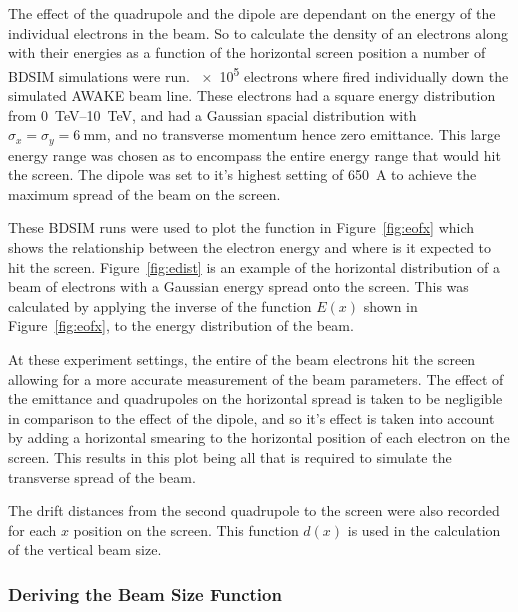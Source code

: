The effect of the quadrupole and the dipole are dependant on the energy of the
individual electrons in the beam.  So to calculate the density of an electrons
along with their energies as a function of the horizontal screen position a
number of BDSIM simulations were run. \num{e5} electrons where fired
individually down the simulated AWAKE beam line. These electrons had a square
energy distribution from \SIrange{0}{10} {\tera\electronvolt}, and had a
Gaussian spacial distribution with \(\sigma_x = \sigma_y =
\SI{6}{\milli\meter}\), and no transverse momentum hence zero emittance. This
large energy range was chosen as to encompass the entire energy range that would
hit the screen. The dipole was set to it's highest setting of \SI{650}{\ampere}
to achieve the maximum spread of the beam on the screen.

These BDSIM runs were used to plot the function in Figure~\ref{fig:eofx} which
shows the relationship between the electron energy and where is it expected to
hit the screen. Figure~\ref{fig:edist} is an example of the horizontal
distribution of a beam of electrons with a Gaussian energy spread onto the
screen. This was calculated by applying the inverse of the function \(E(x)\)
shown in Figure~\ref{fig:eofx}, to the energy distribution of the beam.

At these experiment settings, the entire of the beam electrons hit the screen
allowing for a more accurate measurement of the beam parameters.  The effect of
the emittance and quadrupoles on the horizontal spread is taken to be negligible
in comparison to the effect of the dipole, and so it's effect is taken into
account by adding a horizontal smearing to the horizontal position of each
electron on the screen. This results in this plot being all that is required to
simulate the transverse spread of the beam.

The drift distances from the second quadrupole to the screen were also recorded
for each \(x\) position on the screen. This function \(d(x)\) is used in the
calculation of the vertical beam size.


\subsubsection{Deriving the Beam Size Function}

